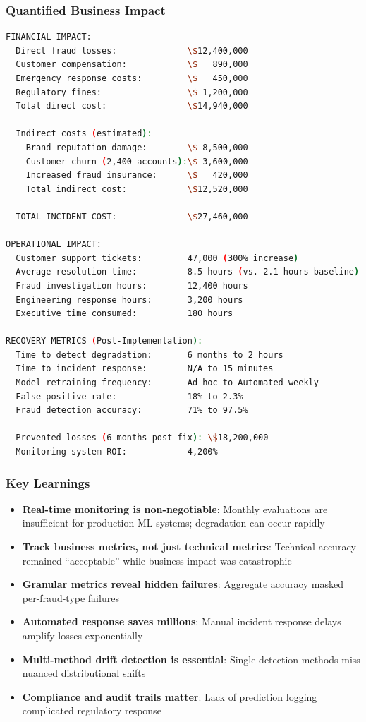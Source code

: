 \subsubsection{Quantified Business Impact}

\begin{lstlisting}[language=bash, caption={Silent Model Death Impact Analysis}]
FINANCIAL IMPACT:
  Direct fraud losses:              \$12,400,000
  Customer compensation:            \$   890,000
  Emergency response costs:         \$   450,000
  Regulatory fines:                 \$ 1,200,000
  Total direct cost:                \$14,940,000

  Indirect costs (estimated):
    Brand reputation damage:        \$ 8,500,000
    Customer churn (2,400 accounts):\$ 3,600,000
    Increased fraud insurance:      \$   420,000
    Total indirect cost:            \$12,520,000

  TOTAL INCIDENT COST:              \$27,460,000

OPERATIONAL IMPACT:
  Customer support tickets:         47,000 (300% increase)
  Average resolution time:          8.5 hours (vs. 2.1 hours baseline)
  Fraud investigation hours:        12,400 hours
  Engineering response hours:       3,200 hours
  Executive time consumed:          180 hours

RECOVERY METRICS (Post-Implementation):
  Time to detect degradation:       6 months to 2 hours
  Time to incident response:        N/A to 15 minutes
  Model retraining frequency:       Ad-hoc to Automated weekly
  False positive rate:              18% to 2.3%
  Fraud detection accuracy:         71% to 97.5%

  Prevented losses (6 months post-fix): \$18,200,000
  Monitoring system ROI:            4,200%
\end{lstlisting}

\subsubsection{Key Learnings}

\begin{itemize}
    \item \textbf{Real-time monitoring is non-negotiable}: Monthly evaluations are insufficient for production ML systems; degradation can occur rapidly
    \item \textbf{Track business metrics, not just technical metrics}: Technical accuracy remained ``acceptable'' while business impact was catastrophic
    \item \textbf{Granular metrics reveal hidden failures}: Aggregate accuracy masked per-fraud-type failures
    \item \textbf{Automated response saves millions}: Manual incident response delays amplify losses exponentially
    \item \textbf{Multi-method drift detection is essential}: Single detection methods miss nuanced distributional shifts
    \item \textbf{Compliance and audit trails matter}: Lack of prediction logging complicated regulatory response
\end{itemize}

